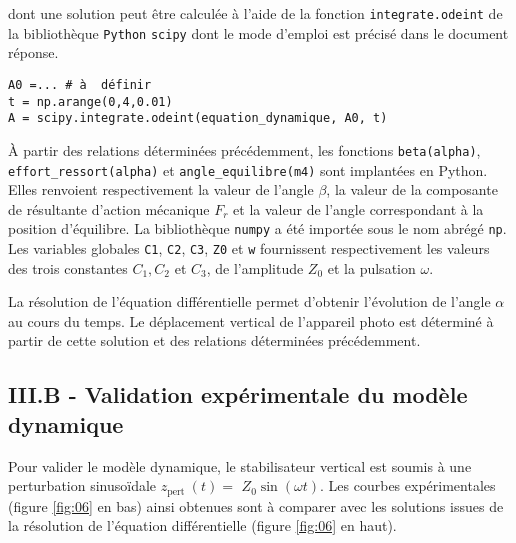 dont une solution peut être calculée à l'aide de la fonction \texttt{integrate.odeint} de la bibliothèque \texttt{Python} \texttt{scipy} dont le mode d'emploi est précisé dans le document réponse. 

\begin{lstlisting}
A0 =... # à  définir
t = np.arange(0,4,0.01)
A = scipy.integrate.odeint(equation_dynamique, A0, t)
\end{lstlisting}

À partir des relations déterminées précédemment, les fonctions \texttt{beta(alpha)}, \texttt{effort\_ressort(alpha)} et \texttt{angle\_equilibre(m4)} sont implantées en Python. Elles renvoient respectivement la valeur de l'angle $\beta$, la valeur de la composante de résultante d'action mécanique $F_{r}$ et la valeur de l'angle correspondant à la position d'équilibre. La bibliothèque \texttt{numpy} a été importée sous le nom abrégé \texttt{np}. Les variables globales \texttt{C1}, \texttt{C2}, \texttt{C3}, \texttt{Z0} et \texttt{w} fournissent respectivement les valeurs des trois constantes $C_{1}, C_{2}$ et $C_{3}$, de l'amplitude $Z_{0}$ et la pulsation $\omega$.

\ifprof
\begin{corrige}
\end{corrige}
\else
\fi

\ifprof
\begin{corrige}
\end{corrige}
\else
\fi

La résolution de l'équation différentielle permet d'obtenir l'évolution de l'angle $\alpha$ au cours du temps. Le déplacement vertical de l'appareil photo est déterminé à partir de cette solution et des relations déterminées précédemment.

\subsection{III.B - Validation expérimentale du modèle dynamique}
Pour valider le modèle dynamique, le stabilisateur vertical est soumis à une perturbation sinusoïdale $z_{\text {pert }}(t)=$ $Z_{0} \sin (\omega t)$. Les courbes expérimentales (figure \ref{fig:06} en bas) ainsi obtenues sont à comparer avec les solutions issues de la résolution de l'équation différentielle (figure \ref{fig:06} en haut).

